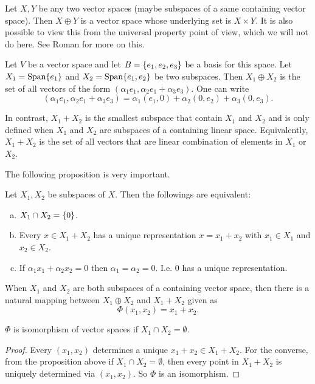 Let $ X,Y $ be any two vector spaces (maybe subspaces of a same containing vector space). Then $ X\oplus Y $ is a vector space whose underlying set is $ X\times Y $. It is also possible to view this from the universal property point of view, which we will not do here. See Roman for more on this.

\begin{example}
	Let $ V $ be a vector space and let $ B = \{e_1,e_2,e_3\} $ be a basis for this space. Let $ X_1 = \operatorname{Span}\{e_1\} $ and $ X_2 = \operatorname{Span}\{e_1,e_2\} $ be two subspaces. Then $ X_1\oplus X_2 $ is the set of all vectors of the form $ (\alpha_1 e_1, \alpha_2 e_1+\alpha_3 e_3) $. One can write
	\[ (\alpha_1 e_1, \alpha_2 e_1 + \alpha_3 e_3) = \alpha_1(e_1,0) + \alpha_2(0,e_2) + \alpha_3(0,e_3).  \]
\end{example}

In contrast, $ X_1+X_2 $ is the smallest subspace that contain $ X_1 $ and $ X_2 $ and is only defined when $ X_1 $ and $ X_2 $ are subspaces of a containing linear space. Equivalently, $ X_1+X_2 $ is the set of all vectors that are linear combination of elements in $ X_1 $ or $ X_2 $.

The following proposition is very important.
\begin{proposition}
	Let $ X_1,X_2 $ be subspaces of $ X $. Then the followings are equivalent:
	\begin{enumerate}[(a)]
		\item $ X_1\cap X_2 = \{0\} $.
		\item Every $ x\in X_1+X_2 $ has a unique representation $ x=x_1+x_2 $ with $ x_1\in X_1 $ and $ x_2 \in X_2 $.
		\item If $ \alpha_1 x_1 + \alpha_2 x_2 = 0 $ then $ \alpha_1 = \alpha_2 = 0 $. I.e. $ 0 $ has a unique representation.
	\end{enumerate}
\end{proposition}

When $ X_1 $ and $ X_2 $ are both subspaces of a containing vector space, then there is a natural mapping between $ X_1\oplus X_2 $ and $ X_1+X_2 $ given as
\[ \Phi(x_1,x_2) = x_1+x_2. \]
\begin{proposition}
	$ \Phi $ is isomorphism of vector spaces if $ X_1\cap X_2 = \emptyset $. 
\end{proposition} 
\begin{proof}
	Every $ (x_1,x_2) $ determines a unique $ x_1+x_2 \in X_1+X_2 $. For the converse, from the proposition above if $ X_1\cap X_2 = \emptyset $, then every point in $ X_1+X_2 $ is uniquely determined via $ (x_1,x_2) $. So $ \Phi $ is an isomorphism.
\end{proof}

